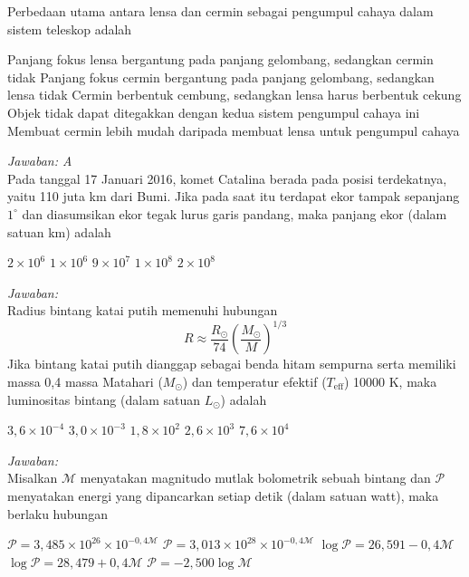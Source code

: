 \documentclass[11pt,fleqn, a4paper]{exam}
\begin{document}
\begin{questions}
\question Perbedaan utama antara lensa dan cermin sebagai pengumpul cahaya dalam sistem teleskop adalah
\begin{choices}
\choice Panjang fokus lensa bergantung pada panjang gelombang, sedangkan cermin tidak
\choice Panjang fokus cermin bergantung pada panjang gelombang, sedangkan lensa tidak
\choice Cermin berbentuk cembung, sedangkan lensa harus berbentuk cekung
\choice Objek tidak dapat ditegakkan dengan kedua sistem pengumpul cahaya ini
\choice Membuat cermin lebih mudah daripada membuat lensa untuk pengumpul cahaya
\end{choices}

\textit{Jawaban: A}\\



\vspace{0.5cm}
\question Pada tanggal 17 Januari 2016, komet Catalina berada pada posisi terdekatnya, yaitu 110 juta km dari Bumi. Jika pada saat itu terdapat ekor tampak sepanjang $1^{\circ}$ dan diasumsikan ekor tegak lurus garis pandang, maka panjang ekor (dalam satuan km) adalah
\begin{choices}
\choice $2 \times 10^6$
\choice $1 \times 10^6$
\choice $9 \times 10^7$
\choice $1 \times 10^8$
\choice $2 \times 10^8$
\end{choices}

\textit{Jawaban: }\\


\vspace{0.5cm}
\question Radius bintang katai putih memenuhi hubungan
\begin{equation*}
R \approx \frac{R_{\odot}}{74} \left( \frac{M_{\odot}}{M} \right)^{1/3}
\end{equation*}
Jika bintang katai putih dianggap sebagai benda hitam sempurna serta memiliki massa 0,4 massa Matahari ($M_{\odot}$) dan temperatur efektif ($T_{\text{eff}}$) 10000 K, maka luminositas bintang (dalam satuan $L_{\odot}$) adalah
\begin{choices}
\choice $3,6 \times 10^{-4}$
\choice $3,0 \times 10^{-3}$
\choice $1,8 \times 10^{2}$
\choice $2,6 \times 10^{3}$
\choice $7,6 \times 10^{4}$
\end{choices}

\textit{Jawaban: }\\


\vspace{0.5cm}
\question Misalkan $\mathcal{M}$ menyatakan magnitudo mutlak bolometrik sebuah bintang dan $\mathcal{P}$ menyatakan energi yang dipancarkan setiap detik (dalam satuan watt), maka berlaku hubungan
\begin{choices}
\choice $\mathcal{P} = 3,485 \times 10^{26} \times 10^{-0,4 \mathcal{M}}$
\choice $\mathcal{P} = 3,013 \times 10^{28} \times 10^{-0,4 \mathcal{M}}$
\choice $\log{\mathcal{P}} = 26,591 - 0,4 \mathcal{M}$
\choice $\log{\mathcal{P}} = 28,479 + 0,4 \mathcal{M}$
\choice $\mathcal{P} = -2,500 \log{\mathcal{M}}$
\end{choices}


\end{questions}
\end{document}
